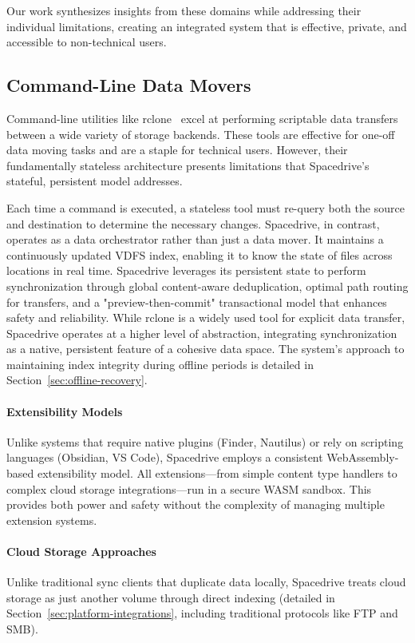 \documentclass[sigconf]{acmart}
\begin{document}
Our work synthesizes insights from these domains while addressing their individual limitations, creating an integrated system that is effective, private, and accessible to non-technical users.

\subsection{Command-Line Data Movers}
Command-line utilities like rclone~\cite{rclone_reference} excel at performing scriptable data transfers between a wide variety of storage backends. These tools are effective for one-off data moving tasks and are a staple for technical users. However, their fundamentally stateless architecture presents limitations that Spacedrive's stateful, persistent model addresses.

Each time a command is executed, a stateless tool must re-query both the source and destination to determine the necessary changes. Spacedrive, in contrast, operates as a data orchestrator rather than just a data mover. It maintains a continuously updated VDFS index, enabling it to know the state of files across locations in real time. Spacedrive leverages its persistent state to perform synchronization through global content-aware deduplication, optimal path routing for transfers, and a "preview-then-commit" transactional model that enhances safety and reliability. While rclone is a widely used tool for explicit data transfer, Spacedrive operates at a higher level of abstraction, integrating synchronization as a native, persistent feature of a cohesive data space. The system's approach to maintaining index integrity during offline periods is detailed in Section~\ref{sec:offline-recovery}.
\paragraph{Extensibility Models}
Unlike systems that require native plugins (Finder, Nautilus) or rely on scripting languages (Obsidian, VS Code), Spacedrive employs a consistent WebAssembly-based extensibility model. All extensions—from simple content type handlers to complex cloud storage integrations—run in a secure WASM sandbox. This provides both power and safety without the complexity of managing multiple extension systems.

\paragraph{Cloud Storage Approaches}
Unlike traditional sync clients that duplicate data locally, Spacedrive treats cloud storage as just another volume through direct indexing (detailed in Section~\ref{sec:platform-integrations}, including traditional protocols like FTP and SMB).
\end{document}
